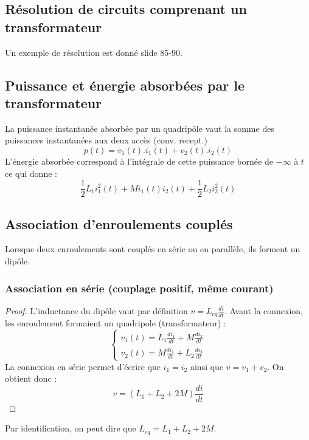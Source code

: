 \documentclass	[11pt, a4paper, openany]{book}
\begin{document}
\setcounter{subsection}{2}
\subsection{Résolution de circuits comprenant un transformateur}
Un exemple de résolution est donné slide 85-90.

\subsection{Puissance et énergie absorbées par le transformateur}
La puissance instantanée absorbée par un quadripôle vaut la somme des puissances instantanées aux deux accès (conv. recept.)
\begin{equation}
p(t) = v_1(t).i_1(t) + v_2(t).i_2(t)
\end{equation}
L'énergie absorbée correspond à l'intégrale de cette puissance bornée de $-\infty$ à $t$ ce qui donne :
\begin{equation}
\frac{1}{2}L_1i^2_1(t) + Mi_1(t)i_2(t) + \frac{1}{2}L_2i_2^2(t)
\end{equation}


\subsection{Association d'enroulements couplés}
Lorsque deux enroulements sont couplés en série ou en parallèle, ils forment un dipôle.
\subsubsection{Association en série (couplage positif, même courant)}
\begin{proof}
L'inductance du dipôle vaut par définition $v = L_{eq}\frac{di}{dt}$. Avant la connexion, les enroulement formaient un quadripole (transformateur) :
\begin{equation}
\left\{\begin{array}{l}
v_1(t) = L_1\frac{di_1}{dt} + M \frac{di_2}{dt}\\
v_2(t) = M\frac{di_1}{dt} + L_2 \frac{di_2}{dt}
\end{array}\right.
\end{equation}
La connexion en série permet d'écrire que $i_1 = i_2$ ainsi que $v = v_1 + v_2$. On obtient donc :
\begin{equation}
v = (L_1 + L_2 + 2M)\frac{di}{dt}
\end{equation}
\end{proof}
Par identification, on peut dire que $L_{eq} = L_1 + L_2 + 2M$.\\
\end{document}
